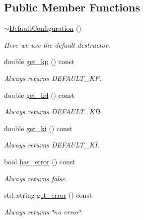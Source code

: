 \subsection*{Public Member Functions}
\begin{DoxyCompactItemize}
\item 
\hyperlink{classci__example__cpp_1_1DefaultConfiguration_a27c16bc673fbd02ef7cd0b66aa677ec7}{$\sim$\+Default\+Configuration} ()
\begin{DoxyCompactList}\small\item\em Here we use the default destructor. \end{DoxyCompactList}\item 
double \hyperlink{classci__example__cpp_1_1DefaultConfiguration_aed613eb3bec06c4459fa3b9e25aefa7c}{get\+\_\+kp} () const
\begin{DoxyCompactList}\small\item\em Always returns D\+E\+F\+A\+U\+L\+T\+\_\+\+KP. \end{DoxyCompactList}\item 
double \hyperlink{classci__example__cpp_1_1DefaultConfiguration_a5eee0c350de525150b04c81a72cd5932}{get\+\_\+kd} () const
\begin{DoxyCompactList}\small\item\em Always returns D\+E\+F\+A\+U\+L\+T\+\_\+\+KD. \end{DoxyCompactList}\item 
double \hyperlink{classci__example__cpp_1_1DefaultConfiguration_a8853e68911e4fd8baf547ac5cffe38db}{get\+\_\+ki} () const
\begin{DoxyCompactList}\small\item\em Always returns D\+E\+F\+A\+U\+L\+T\+\_\+\+KI. \end{DoxyCompactList}\item 
bool \hyperlink{classci__example__cpp_1_1DefaultConfiguration_aba675295652a7530bbb2148bec700ab0}{has\+\_\+error} () const
\begin{DoxyCompactList}\small\item\em Always returns false. \end{DoxyCompactList}\item 
std\+::string \hyperlink{classci__example__cpp_1_1DefaultConfiguration_a06034c96faa086c539a14643534d5aac}{get\+\_\+error} () const
\begin{DoxyCompactList}\small\item\em Always returns \char`\"{}no error\char`\"{}. \end{DoxyCompactList}\end{DoxyCompactItemize}


